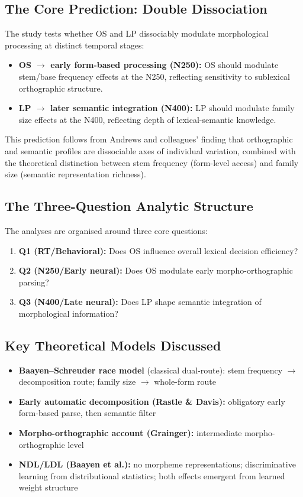 \documentclass[11pt, a4paper]{article}
\begin{document}
\subsection{The Core Prediction: Double Dissociation}

The study tests whether OS and LP dissociably modulate morphological processing at distinct temporal stages:
\begin{itemize}[leftmargin=1.5em]
  \item \textbf{OS $\to$ early form-based processing (N250):} OS should modulate stem/base frequency effects at the N250, reflecting sensitivity to sublexical orthographic structure.
  \item \textbf{LP $\to$ later semantic integration (N400):} LP should modulate family size effects at the N400, reflecting depth of lexical-semantic knowledge.
\end{itemize}

This prediction follows from Andrews and colleagues' finding that orthographic and semantic profiles are dissociable axes of individual variation, combined with the theoretical distinction between stem frequency (form-level access) and family size (semantic representation richness).

\subsection{The Three-Question Analytic Structure}

The analyses are organised around three core questions:
\begin{enumerate}[leftmargin=1.5em]
  \item \textbf{Q1 (RT/Behavioral):} Does OS influence overall lexical decision efficiency?
  \item \textbf{Q2 (N250/Early neural):} Does OS modulate early morpho-orthographic parsing?
  \item \textbf{Q3 (N400/Late neural):} Does LP shape semantic integration of morphological information?
\end{enumerate}

\subsection{Key Theoretical Models Discussed}

\begin{itemize}[leftmargin=1.5em]
  \item \textbf{Baayen--Schreuder race model} (classical dual-route): stem frequency $\to$ decomposition route; family size $\to$ whole-form route
  \item \textbf{Early automatic decomposition (Rastle \& Davis):} obligatory early form-based parse, then semantic filter
  \item \textbf{Morpho-orthographic account (Grainger):} intermediate morpho-orthographic level
  \item \textbf{NDL/LDL (Baayen et al.):} no morpheme representations; discriminative learning from distributional statistics; both effects emergent from learned weight structure
\end{itemize}
\end{document}
